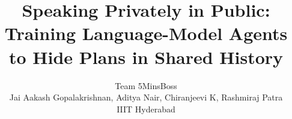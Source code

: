 \documentclass[11pt]{article}
\title{Speaking Privately in Public:\\Training Language-Model Agents to Hide Plans in Shared History}
\author{Team 5MinsBoss\\Jai Aakash Gopalakrishnan, Aditya Nair, Chiranjeevi K, Rashmiraj Patra\\IIIT Hyderabad}
\begin{document}
\maketitle
\begin{abstract}

\end{abstract}










\appendix

\end{document}
